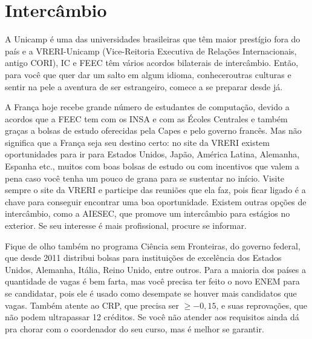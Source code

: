 
\section{Intercâmbio}

A Unicamp é uma das universidades brasileiras que têm maior prestígio fora do
país e a VRERI-Unicamp (Vice-Reitoria Executiva de Relações Internacionais,
antigo CORI), IC e FEEC têm vários acordos bilaterais de intercâmbio. Então,
para você que quer dar um salto em algum idioma, conheceroutras culturas e
sentir na pele a aventura de ser estrangeiro, comece a se preparar desde já.

A França hoje recebe grande número de estudantes de computação, devido a acordos
que a FEEC tem com os INSA e com as Écoles Centrales e também graças a bolsas de
estudo oferecidas pela Capes e pelo governo francês. Mas não significa que a
França seja seu destino certo: no site da VRERI existem oportunidades para ir
para Estados Unidos, Japão, América Latina, Alemanha, Espanha etc., muitos com
boas bolsas de estudo ou com incentivos que valem a pena caso você tenha um
pouco de grana para se sustentar no início. Visite sempre o site da VRERI e
participe das reuniões que ela faz, pois ficar ligado é a chave para conseguir
encontrar uma boa oportunidade. Existem outras opções de intercâmbio, como a
AIESEC, que promove um intercâmbio para estágios no exterior. Se seu interesse é
mais profissional, procure se informar.

Fique de olho também no programa Ciência sem Fronteiras, do governo federal, que
desde 2011 distribui bolsas para instituições de excelência dos Estados Unidos,
Alemanha, Itália, Reino Unido, entre outros. Para a maioria dos países a
quantidade de vagas é bem farta, mas você precisa ter feito o novo ENEM para se
candidatar, pois ele é usado como desempate se houver mais candidatos que
vagas. Também atente ao CRP, que precisa ser $\geq -0{,}15$, e suas reprovações,
que não podem ultrapassar 12 créditos. Se você não atender aos requisitos ainda
dá pra chorar com o coordenador do seu curso, mas é melhor se garantir.


